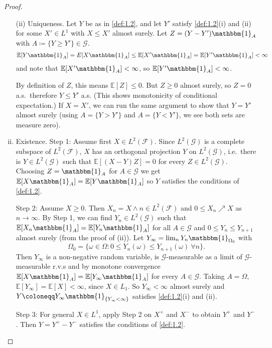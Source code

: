\documentclass{article}
\newcommand{\F}{\mathcal{F}}
\newcommand{\G}{\mathcal{G}}
\newcommand{\1}[1]{\mathbbm{1}_{#1}}
\newcommand{\E}{\mathbb{E}}
\begin{document}
\begin{proof}\leavevmode
  \begin{enumerate}[(i)]
    \item[(ii)] Uniqueness. Let $Y$ be as in \cref{def:1.2}, and let $Y'$ satisfy \cref*{def:1.2}(i) and (ii) for some $X' \in L^1$ with $X \leq X'$ almost surely.
      Let $Z = (Y-Y') \1A$ with $A \coloneqq \{Y \geq Y'\} \in \G$.
      \begin{equation*}
        \E[Y \1A] = %
        E[X \1A] \leq %
        \E[X' \1A] =
        \E[Y' \1A] < \infty
      \end{equation*}
      and note that $\E[X' \1A] < \infty$, so $\E[Y' \1A] < \infty$.

      By definition of $Z$, this means $\E[Z] \leq 0$. But $Z \geq 0$ almost surely, so $Z=0$ a.s.\ therefore $Y \leq Y'$ a.s.
      (This shows monotonicity of conditional expectation.)
      If $X = X'$, we can run the same argument to show that $Y = Y'$ almost surely (using $A = \{Y > Y'\}$ and $A = \{Y < Y'\}$, we see both sets are measure zero).
    \item Existence. Step 1: Assume first $X \in L^2(\F)$. Since $L^2(\G)$ is a complete subspace of $L^2(\F)$, $X$ has an orthogonal projection $Y$ on $L^2(\G)$, i.e.\ there is $Y \in L^2(\G)$ such that $\E[(X-Y)Z] = 0$ for every $Z \in L^2(\G)$.
      Choosing $Z = \1A$ for $A \in \G$ we get $\E[X \1A] = \E[Y \1A]$ so $Y$ satisfies the conditions of \cref{def:1.2}.

      Step 2: Assume $X \geq 0$. Then $X_n = X \wedge n \in L^2(\F)$ and $0 \leq X_n \nearrow X$ as $n \to \infty$.
      By Step 1, we can find $Y_n \in L^2(\G)$ such that $\E[X_n \1A] = \E[Y_n \1A]$ for all $A \in \G$ and $0 \leq Y_n \leq Y_{n+1}$ almost surely (from the proof of (ii)).
      Let $Y_\infty = \lim_n Y_n \1{\Omega_0}$ with
      \begin{equation*}
        \Omega_0 = \{\omega \in \Omega : 0 \leq Y_n(\omega) \leq Y_{n+1}(\omega) \ \forall n\}.
      \end{equation*}
      Then $Y_\infty$ is a non-negative random variable, is $\G$-measurable as a limit of $\G$-measurable r.v.s and by monotone convergence $\E[X \1A] = \E[Y_\infty \1A]$ for every $A \in \G$.
      Taking $A = \Omega$, $\E[Y_\infty] = \E[X] < \infty$, since $X \in L_1$.
      So $Y_\infty < \infty$ almost surely and $Y \coloneqq Y_\infty \1{\{Y_\infty < \infty\}}$ satisfies \cref{def:1.2}(i) and (ii).

      Step 3: For general $X \in L^1$, apply Step 2 on $X^+$ and $X^-$ to obtain $Y^+$ and $Y^-$. Then $Y = Y^+ - Y^-$ satisfies the conditions of \cref{def:1.2}. \qedhere
  \end{enumerate}
\end{proof}
\end{document}
